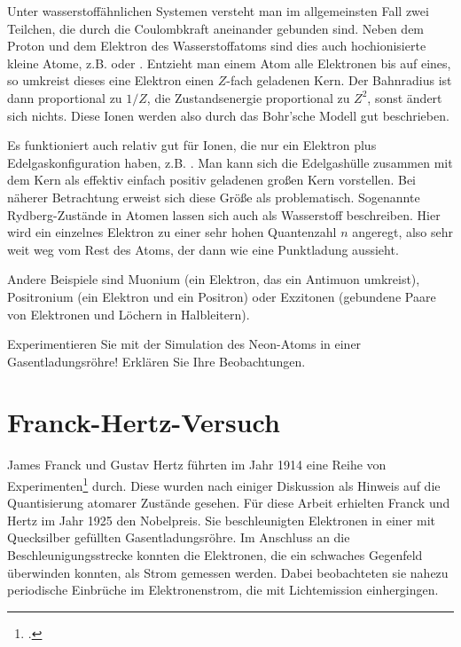 Unter wasserstoffähnlichen Systemen versteht man im allgemeinsten Fall zwei Teilchen, die durch die Coulombkraft aneinander gebunden sind. Neben dem Proton und dem Elektron des Wasserstoffatoms sind dies auch hochionisierte kleine Atome, z.B.  oder . Entzieht man einem Atom alle Elektronen bis auf eines, so umkreist dieses eine Elektron einen $Z$-fach geladenen Kern. Der Bahnradius ist dann proportional zu $1/Z$, die Zustandsenergie proportional zu $Z^2$, sonst ändert sich nichts. Diese Ionen werden also durch das Bohr'sche Modell gut beschrieben. 

Es funktioniert auch relativ gut für Ionen, die nur ein Elektron plus Edelgaskonfiguration haben, z.B. . Man kann sich die Edelgashülle zusammen mit dem Kern als effektiv einfach positiv geladenen großen Kern vorstellen. Bei näherer Betrachtung erweist sich diese Größe als problematisch. Sogenannte Rydberg-Zustände in Atomen lassen sich auch als Wasserstoff beschreiben. Hier wird ein einzelnes Elektron zu einer sehr hohen Quantenzahl $n$ angeregt, also sehr weit weg vom Rest des Atoms, der dann wie eine Punktladung aussieht. 

Andere Beispiele sind Muonium (ein Elektron, das ein Antimuon umkreist), Positronium (ein Elektron und ein Positron) oder Exzitonen (gebundene Paare von Elektronen und Löchern in Halbleitern). 

\begin{questions}
    \item Experimentieren Sie mit der Simulation des Neon-Atoms in einer Gasentladungsröhre! Erklären Sie Ihre Beobachtungen.
\end{questions}


\section{Franck-Hertz-Versuch}

James Franck und Gustav Hertz führten im Jahr 1914 eine Reihe von Experimenten\footcite{Franck1914a,Franck1914b} durch. Diese wurden nach einiger Diskussion als Hinweis auf die Quantisierung atomarer Zustände gesehen. Für diese Arbeit erhielten Franck und Hertz im Jahr 1925 den Nobelpreis. Sie beschleunigten Elektronen in einer mit Quecksilber gefüllten Gasentladungsröhre. Im Anschluss an die Beschleunigungsstrecke konnten die Elektronen, die ein schwaches Gegenfeld überwinden konnten, als Strom gemessen werden. Dabei beobachteten sie nahezu periodische Einbrüche im Elektronenstrom, die mit Lichtemission einhergingen.

